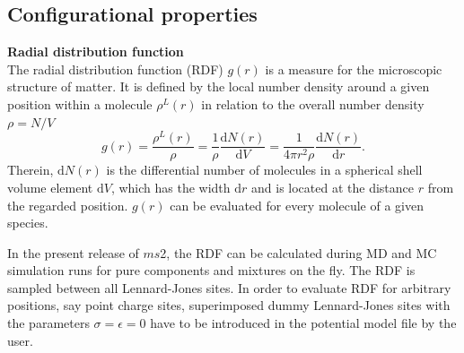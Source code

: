 

\subsection{Configurational properties}
\label{sec:configurational properties}

\textbf{Radial distribution function}\\
The {radial distribution} function (RDF) $g(r)$ is a measure for the microscopic structure of matter. It is defined by the local number density around a given position within a molecule $\rho^L(r)$ in relation to the overall number density $\rho = N/V$
\begin{equation} g(r) = \dfrac{\rho^L(r)}{\rho} = \dfrac{1}{\rho}\dfrac{\mathrm{d}N(r)}{\mathrm{d}V} = \dfrac{1}{4 \pi r^2 \rho} \dfrac{\mathrm{d}N(r)}{\mathrm{d}r}. \label{Eq:gr} \end{equation}
Therein, $\mathrm{d}N(r)$ is the differential number of molecules in a spherical shell volume element $\mathrm{d}V$, which has the width $\mathrm{d}r$ and is located at the distance $r$ from the regarded position. $g(r)$ can be evaluated for every molecule of a given species. 

In the present release of $ms$2, the RDF can be calculated during MD and MC simulation runs for pure components and mixtures on the fly. The RDF is sampled between all Lennard-Jones sites. In order to evaluate RDF for arbitrary positions, say point charge sites, superimposed dummy Lennard-Jones sites with the parameters $\sigma = \epsilon = 0$ have to be introduced in the potential model file by the user.


